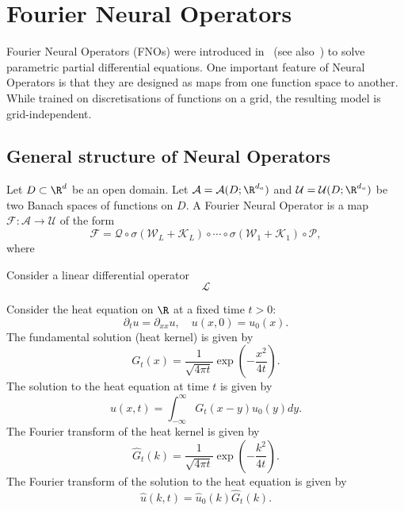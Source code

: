 \section{Fourier Neural Operators}
\label{sec:fno}

Fourier Neural Operators (FNOs) were introduced in~\cite{li2020fourier} (see also~\cite{kovachki2023neuraloperatorduruisseaux2025guide}) to solve parametric partial differential equations. 
One important feature of Neural Operators is that they are designed as maps from one function space to another. 
While trained on discretisations of functions on a grid, the resulting model is grid-independent.

\subsection{General structure of Neural Operators}
Let $D\subset \R^d$ be an open domain. 
Let $\mathcal{A}=\mathcal{A}(D;\R^{d_a})$ and $\mathcal{U}=\mathcal{U}(D;\R^{d_u})$ be two Banach spaces of functions on $D$.
A Fourier Neural Operator is a map $\mathcal{F}:\mathcal{A}\to \mathcal{U}$ of the form
\begin{equation*}
  \mathcal{F} = \mathcal{Q}\circ \sigma(\mathcal{W}_L+\mathcal{K}_L)\circ \cdots \circ \sigma(\mathcal{W}_1+\mathcal{K}_1)\circ \mathcal{P},
\end{equation*}
where 



Consider a linear differential operator
\begin{equation*}
  \mathcal{L}
\end{equation*}

\begin{example}
Consider the heat equation on $\R$ at a fixed time $t>0$:
\begin{equation*}
  \partial_t u = \partial_{xx} u, \quad u(x,0)=u_0(x).
\end{equation*}
The fundamental solution (heat kernel) is given by
\begin{equation*}
  G_t(x) = \frac{1}{\sqrt{4\pi t}} \exp\left(-\frac{x^2}{4t}\right).
\end{equation*}
The solution to the heat equation at time $t$ is given by
\begin{equation*}
  u(x,t) = \int_{-\infty}^{\infty} G_t(x-y) u_0(y) dy.
\end{equation*}
The Fourier transform of the heat kernel is given by
\begin{equation*}
  \hat{G}_t(k) = \frac{1}{\sqrt{4\pi t}} \exp\left(-\frac{k^2}{4t}\right).
\end{equation*}
The Fourier transform of the solution to the heat equation is given by
\begin{equation*}
  \hat{u}(k,t) = \hat{u}_0(k) \hat{G}_t(k).
\end{equation*}
\end{example}